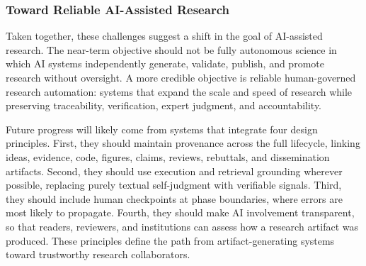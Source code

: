 \documentclass{llmxive}
\begin{document}
\subsubsection{Toward Reliable AI-Assisted Research}

Taken together, these challenges suggest a shift in the goal of AI-assisted research. The near-term objective should not be fully autonomous science in which AI systems independently generate, validate, publish, and promote research without oversight. A more credible objective is reliable human-governed research automation: systems that expand the scale and speed of research while preserving traceability, verification, expert judgment, and accountability.

Future progress will likely come from systems that integrate four design principles. First, they should maintain provenance across the full lifecycle, linking ideas, evidence, code, figures, claims, reviews, rebuttals, and dissemination artifacts. Second, they should use execution and retrieval grounding wherever possible, replacing purely textual self-judgment with verifiable signals. Third, they should include human checkpoints at phase boundaries, where errors are most likely to propagate. Fourth, they should make AI involvement transparent, so that readers, reviewers, and institutions can assess how a research artifact was produced. These principles define the path from artifact-generating systems toward trustworthy research collaborators.
\end{document}
